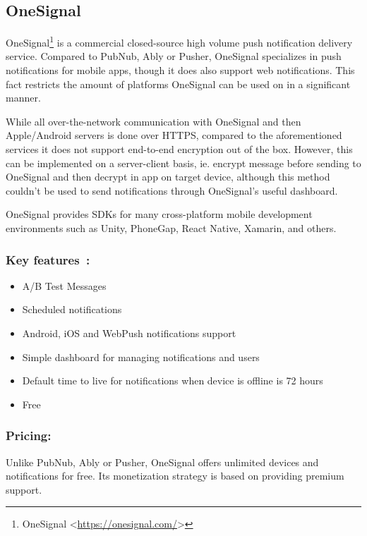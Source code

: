 \subsection{OneSignal}
OneSignal\footnote{OneSignal <\url{https://onesignal.com/}>} is a commercial closed-source high volume push notification delivery service. Compared to PubNub, Ably or Pusher, OneSignal specializes in push notifications for mobile apps, though it does also support web notifications. This fact restricts the amount of platforms OneSignal can be used on in a significant manner.

While all over-the-network communication with OneSignal and then Apple/Android servers is done over HTTPS, compared to the aforementioned services it does not support end-to-end encryption out of the box\cite{onesignal-https}. However, this can be implemented on a server-client basis, ie. encrypt message before sending to OneSignal and then decrypt in app on target device, although this method couldn't be used to send notifications through OneSignal's useful dashboard.

OneSignal provides SDKs for many cross-platform mobile development environments such as Unity, PhoneGap, React Native, Xamarin, and others.

\subsubsection*{Key features~\protect\cite{onesignal}:}
\begin{itemize}
\item A/B Test Messages
\item Scheduled notifications
\item Android, iOS and WebPush notifications support
\item Simple dashboard for managing notifications and users
\item Default time to live for notifications when device is offline is 72 hours\cite{onesignal-ttl}
\item Free
\end{itemize}

\subsubsection*{Pricing:}

Unlike PubNub, Ably or Pusher, OneSignal offers unlimited devices and notifications for free. Its monetization strategy is based on providing premium support.


